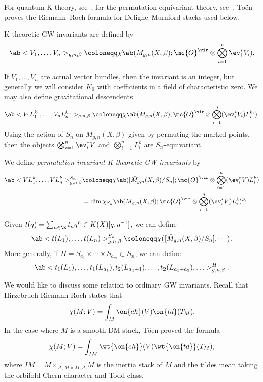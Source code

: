 For quantum K-theory, see~\cite{Lee2004}; for the permutation-equivariant theory, see~\cite{Givental2017K1,GiventalK7}. To\"en~\cite{Toen1999} proves the Riemann--Roch formula for Deligne--Mumford stacks used below.

\begin{defn}
    K-theoretic GW invariants are defined by
    \[ \ab<V_1, \ldots, V_n>_{g,n,\beta} \coloneqq \chi\ab(\bar{M}_{g,n}(X, \beta); \mc{O}^{\vir} \otimes \bigotimes_{i=1}^n \ev_i^* V_i). \]
\end{defn}

If \(V_1, \ldots, V_n\) are actual vector bundles, then the invariant is an integer, but generally we will consider \(K_0\) with coefficients in a field of characteristic zero. We may also define gravitational descendents
\[ \ab<V_1 L_1^{k_1}, \ldots, V_n L_n^{k_n}>_{g,n,\beta} \coloneqq \chi\ab(\bar{M}_{g,n}(X, \beta); \mc{O}^{\vir} \otimes \bigotimes_{i=1}^n ( \ev_i^* V_i )L_i^{k_i} ). \]
Using the action of \(S_n\) on \(\bar{M}_{g,n}(X, \beta)\) given by permuting the marked points, then the objects \(\bigotimes_{i=1}^n \ev_i^* V\) and \(\bigotimes_{i=1}^n L_i^k\) are \(S_n\)-equivariant.

\begin{defn}
    We define \textit{permutation-invariant K-theoretic GW invariants} by
    \begin{align*}
        \ab<V L_1^k, \ldots, V L_n^k>_{g,n,\beta}^{S_n} &\coloneqq \chi\ab([ \bar{M}_{g,n}(X, \beta)/S_n ]; \mc{O}^{\vir} \otimes \bigotimes_{i=1}^n ( \ev_i^* V ) L_i^k) \\
        &= \dim \chi_{S_n} \ab(\bar{M}_{g,n}(X, \beta); \mc{O}^{\vir} \otimes \bigotimes_{i=1}^n ( \ev_i^* V ) L_i^k )^{S_n}.
    \end{align*}
\end{defn}

Given \(t(q) = \sum_{n \in \Z} t_n q^n \in K(X)[q,q^{-1}]\), we can define
\[ \ab< t(L_1), \ldots, t(L_n)>^{S_n}_{g,n,\beta} \coloneqq \chi ([\bar{M}_{g,n}(X,\beta)/S_n], \cdots). \]
More generally, if \(H = S_{a_1} \times \cdots \times S_{a_m} \subset S_n\), we can define
\[ \ab<t_1(L_1), \ldots, t_1(L_{a_1}), t_2(L_{a_1+1}), \ldots, t_2(L_{a_1+a_2}), \ldots>_{g,n,\beta}^H. \]

\begin{rmk}
    We would like to discuss some relation to ordinary GW invariants. Recall that Hirzebruch-Riemann-Roch states that 
    \[ \chi(M; V) = \int_M \on{ch}(V) \on{td}(T_M). \]
    In the case where \(M\) is a smooth DM stack, T\"oen proved the formula
    \[ \chi(M; V) = \int_{IM} \wt{\on{ch}}(V) \wt{\on{td}}(T_M), \]
    where \(IM = M \times_{\Delta, M \times M, \Delta} M\) is the inertia stack of \(M\) and the tildes mean taking the orbifold Chern character and Todd class. 
\end{rmk}

